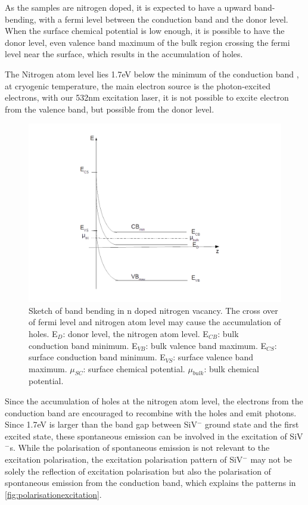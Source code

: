 As the samples are nitrogen doped, it is expected to have a upward band-bending, with a fermi level between the conduction band and the donor level. When the surface chemical potential is low enough, it is possible to have the donor level, even valence band maximum of the bulk region crossing the fermi level near the surface, which results in the accumulation of holes. 

The Nitrogen atom level lies 1.7eV below the minimum of the conduction band \citep{diederich_electron_1998}, at cryogenic temperature, the main electron source is the photon-excited electrons, with our 532nm excitation laser, it is not possible to excite electron from the valence band, but possible from the donor level.

\begin{figure}[h]
\centering
\includegraphics[width=1\linewidth]{Figures/pic/nbandbend}
\caption{Sketch of band bending in n doped nitrogen vacancy. The cross over of fermi level and nitrogen atom level may cause the accumulation of holes. E$_{D}$: donor level, the nitrogen atom level. E$_{CB}$: bulk conduction band minimum. E$_{VB}$: bulk valence band maximum. E$_{CS}$: surface conduction band minimum. E$_{VS}$: surface valence band maximum. $\mu_{SC}$: surface chemical potential. $\mu_{bulk}$: bulk chemical potential.} 
\label{fig:nbandbend}
\end{figure}
 

Since the accumulation of holes at the nitrogen atom level, the electrons from the conduction band are encouraged to recombine with the holes and emit photons. Since 1.7eV is larger than the band gap between SiV$^{-}$ ground state and the first excited state, these spontaneous emission can be involved in the excitation of SiV$^{-}$s. 
While the polarisation of spontaneous emission is not relevant to the excitation polarisation, the excitation polarisation pattern of SiV$^{-}$ may not be solely the reflection of excitation polarisation but also the polarisation of spontaneous emission from the conduction band, which explains the patterns in \ref{fig:polarisationexcitation}.

